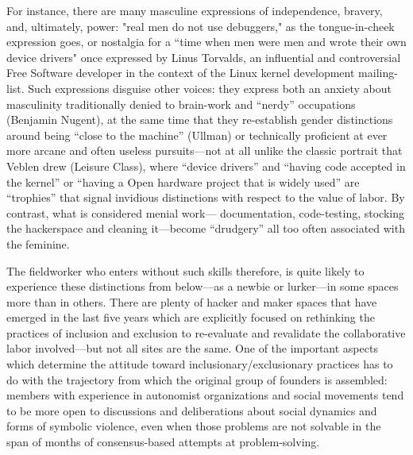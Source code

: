 \documentclass[10pt,letter,oneside]{scrartcl}
\begin{document}
For instance, there are many masculine expressions of independence, bravery, 
and, ultimately, power: "real men do not use debuggers," as the tongue-in-cheek 
expression goes, or nostalgia for a ``time when men were men and wrote their 
own device drivers" once expressed by Linus Torvalds, an influential and 
controversial Free Software developer in the context of the Linux kernel 
development mailing-list.  Such expressions disguise other voices: they express 
both an anxiety about masculinity traditionally denied to brain-work and ``nerdy''
occupations (Benjamin Nugent), at the same time that they re-establish gender 
distinctions around being ``close to the machine'' (Ullman) or technically 
proficient at ever more arcane and often useless pursuits---not at all unlike 
the classic portrait that Veblen drew (Leisure Class), where ``device drivers'' 
and ``having code accepted in the kernel'' or ``having a Open hardware project
that is widely used'' are ``trophies'' that signal invidious distinctions with 
respect to the value of labor.  By contrast, what is considered menial work---
documentation, code-testing, stocking the hackerspace and cleaning it---become 
``drudgery'' all too often associated with the feminine.

The fieldworker who enters without such skills therefore, is quite 
likely to experience these distinctions from below---as a newbie or
lurker---in some spaces more than in others.  There are plenty of
hacker and maker spaces that have emerged in the last five years
which are explicitly focused on rethinking the practices of
inclusion and exclusion to re-evaluate and revalidate the collaborative 
labor involved---but not all sites are the same. One of the important
aspects which determine the attitude toward inclusionary/exclusionary
practices has to do with the trajectory from which the original group
of founders is assembled: members with experience in autonomist 
organizations and social movements tend to be more open to discussions and
deliberations about social dynamics and forms of symbolic violence, even 
when those problems are not solvable in the span of months of consensus-based
attempts at problem-solving.
\end{document}
